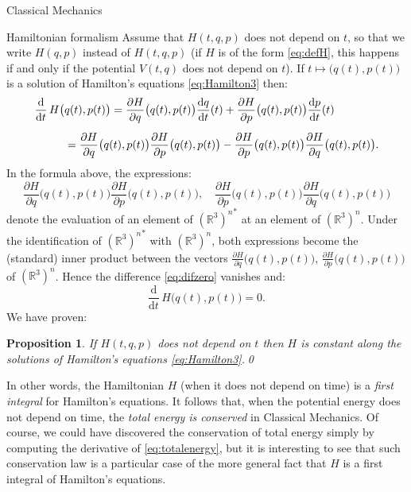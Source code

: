 \documentclass[oneside,a4paper,11pt]{amsbook}
\newcommand{\R}{\mathds R}
\newcommand{\dd}{\mathrm d}
\theoremstyle{remark}\newtheorem{exercise}{Exercise}[chapter]
\theoremstyle{plain}\newtheorem{teo}{Theorem}[section]
\theoremstyle{plain}\newtheorem{lem}[teo]{Lemma}
\theoremstyle{plain}\newtheorem{prop}[teo]{Proposition}
\theoremstyle{plain}\newtheorem{cor}[teo]{Corollary}
\theoremstyle{definition}\newtheorem{defin}[teo]{Definition}
\theoremstyle{remark}\newtheorem{rem}[teo]{Remark}
\theoremstyle{definition}\newtheorem{notation}[teo]{Notation}
\theoremstyle{definition}\newtheorem{convention}[teo]{Convention}
\theoremstyle{definition}\newtheorem{example}[teo]{Example}
\numberwithin{section}{chapter}
\numberwithin{equation}{section}
\begin{document}
\begin{chapter}{Classical Mechanics}
\begin{section}{Hamiltonian formalism}
Assume that $H(t,q,p)$ does not depend on $t$, so that we write $H(q,p)$ instead of $H(t,q,p)$
(if $H$ is of the form \eqref{eq:defH}, this happens if and only if the potential $V(t,q)$ does not depend on $t$).
If $t\mapsto\big(q(t),p(t)\big)$ is a solution of Hamilton's equations \eqref{eq:Hamilton3} then:
\begin{align}
\notag\frac{\dd}{\dd t}\,H\big(&q(t),p(t)\big)=\frac{\partial H}{\partial q}\big(q(t),p(t)\big)\frac{\dd q}{\dd t}(t)
+\frac{\partial H}{\partial p}\big(q(t),p(t)\big)\frac{\dd p}{\dd t}(t)\\[5pt]
\label{eq:difzero}&=\frac{\partial H}{\partial q}\big(q(t),p(t)\big)\frac{\partial H}{\partial p}\big(q(t),p(t)\big)
-\frac{\partial H}{\partial p}\big(q(t),p(t)\big)\frac{\partial H}{\partial q}\big(q(t),p(t)\big).
\end{align}
In the formula above, the expressions:
\[\frac{\partial H}{\partial q}\big(q(t),p(t)\big)\frac{\partial H}{\partial p}\big(q(t),p(t)\big),\quad
\frac{\partial H}{\partial p}\big(q(t),p(t)\big)\frac{\partial H}{\partial q}\big(q(t),p(t)\big)\]
denote the evaluation of an element of ${(\R^3)^n}^*$ at an element of $(\R^3)^n$. Under the identification of ${(\R^3)^n}^*$
with $(\R^3)^n$, both expressions become the (standard) inner product between the vectors
$\frac{\partial H}{\partial q}\big(q(t),p(t)\big)$, $\frac{\partial H}{\partial p}\big(q(t),p(t)\big)$ of
$(\R^3)^n$. Hence the difference \eqref{eq:difzero} vanishes and:
\[\frac{\dd}{\dd t}\,H\big(q(t),p(t)\big)=0.\]
We have proven:
\begin{prop}\label{thm:propHconstant}
If $H(t,q,p)$ does not depend on $t$ then $H$ is constant along the solutions of Hamilton's equations \eqref{eq:Hamilton3}.\qed
\end{prop}
In other words, the Hamiltonian $H$ (when it does not depend on time) is a {\em first integral\/} for Hamilton's equations. It follows that,
when the potential energy does not depend on time, the {\em total energy is conserved\/} in Classical Mechanics. Of course,
we could have discovered the conservation of total energy simply by computing the derivative of \eqref{eq:totalenergy},
but it is interesting to see that such conservation law is a particular case of the more general fact that
$H$ is a first integral of Hamilton's equations.


\end{section}
\end{chapter}
\end{document}
